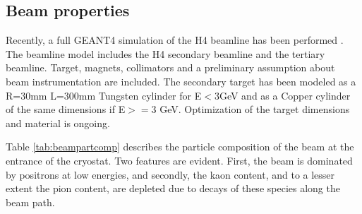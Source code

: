 \subsection{Beam properties}
Recently, a full GEANT4 simulation of the H4 beamline has been performed \cite{H4beamfiles}. 
The beamline model includes the H4 secondary beamline 
and the tertiary beamline.  Target, magnets, collimators and a preliminary assumption
about beam instrumentation are included. The secondary target has been
modeled as a R=30mm L=300mm Tungsten cylinder for   E$<3$GeV and as a Copper cylinder of the same dimensions  if E$>=$3 GeV. Optimization of the target dimensions and material is ongoing.

Table \ref{tab:beampartcomp} describes the particle composition of the
beam at the entrance of the cryostat. Two features are evident. First, the beam is dominated by positrons at low energies,
and secondly, the kaon content, and to a lesser extent the pion content, are depleted due to decays of these species 
along the beam path. 

